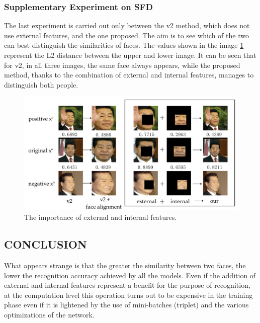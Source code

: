 \subsubsection{Supplementary Experiment on SFD}
The last experiment is carried out only between the v2 method, which does 
not use external features, and the one proposed. The aim is to see which of 
the two can best distinguish the similarities of faces. The values shown in the 
image \ref{fig:fei} represent the L2 distance between the upper and lower image. It can 
be seen that for v2, in all three images, the same face always appears, while 
the proposed method, thanks to the combination of external and internal 
features, manages to distinguish both people.
\begin{figure}[h!]
    \centering
    \includegraphics[width = 0.8\linewidth]{images/paper9/features.png}
    \centering
    \caption{The importance of external and internal features.}
    \label{fig:fei}
\end{figure}

\subsection{CONCLUSION}
What appears strange is that the greater the similarity between two faces, 
the lower the recognition accuracy achieved by all the models. Even if the 
addition of external and internal features represent a benefit for the purpose 
of recognition, at the computation level this operation turns out to be expensive 
in the training phase even if it is lightened by the use of mini-batches 
(triplet) and the various optimizations of the network.
